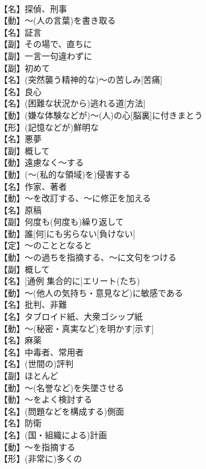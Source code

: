 \documentclass[8pt]{extreport}
\begin{document}
\begin{CJK}{UTF8}{min}
\\	【名】探偵、刑事
\\	【動】～(人の言葉)を書き取る
\\	【名】証言
\\	【副】その場で、直ちに
\\	【副】一言一句違わずに
\\	【副】初めて
\\	【名】(突然襲う精神的な)～の苦しみ[苦痛]
\\	【名】良心
\\	【名】(困難な状況から)逃れる道[方法]
\\	【動】(嫌な体験などが)～(人)の心[脳裏]に付きまとう
\\	【形】(記憶などが)鮮明な
\\	【名】悪夢
\\	【副】概して
\\	【動】遠慮なく～する
\\	【動】(～(私的な領域)を)侵害する
\\	【名】作家、著者
\\	【動】～を改訂する、～に修正を加える
\\	【名】原稿
\\	【副】何度も(何度も)繰り返して
\\	【動】誰[何]にも劣らない[負けない]
\\	【定】～のこととなると
\\	【動】～の過ちを指摘する、～に文句をつける
\\	【副】概して
\\	【名】[通例 集合的に]エリート(たち)
\\	【動】～(他人の気持ち・意見など)に敏感である
\\	【名】批判、非難
\\	【名】タブロイド紙、大衆ゴシップ紙
\\	【動】～(秘密・真実など)を明かす[示す]
\\	【名】麻薬
\\	【名】中毒者、常用者
\\	【名】(世間の)評判
\\	【副】ほとんど
\\	【動】～(名誉など)を失墜させる
\\	【動】～をよく検討する
\\	【名】(問題などを構成する)側面
\\	【名】防衛
\\	【名】(国・組織による)計画
\\	【動】～を指摘する
\\	【形】(非常に)多くの

\end{CJK}
\end{document}
